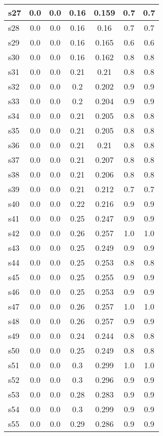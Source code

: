 \documentclass{article}
\begin{document}
\begin{tabular}{|l|c|c|c|c|c|c|}
s27 &0.0 & 0.0 & 0.16 & 0.159 & 0.7 & 0.7\\
\hline
s28 &0.0 & 0.0 & 0.16 & 0.16 & 0.7 & 0.7\\
\hline
s29 &0.0 & 0.0 & 0.16 & 0.165 & 0.6 & 0.6\\
\hline
s30 &0.0 & 0.0 & 0.16 & 0.162 & 0.8 & 0.8\\
\hline
s31 &0.0 & 0.0 & 0.21 & 0.21 & 0.8 & 0.8\\
\hline
s32 &0.0 & 0.0 & 0.2 & 0.202 & 0.9 & 0.9\\
\hline
s33 &0.0 & 0.0 & 0.2 & 0.204 & 0.9 & 0.9\\
\hline
s34 &0.0 & 0.0 & 0.21 & 0.205 & 0.8 & 0.8\\
\hline
s35 &0.0 & 0.0 & 0.21 & 0.205 & 0.8 & 0.8\\
\hline
s36 &0.0 & 0.0 & 0.21 & 0.21 & 0.8 & 0.8\\
\hline
s37 &0.0 & 0.0 & 0.21 & 0.207 & 0.8 & 0.8\\
\hline
s38 &0.0 & 0.0 & 0.21 & 0.206 & 0.8 & 0.8\\
\hline
s39 &0.0 & 0.0 & 0.21 & 0.212 & 0.7 & 0.7\\
\hline
s40 &0.0 & 0.0 & 0.22 & 0.216 & 0.9 & 0.9\\
\hline
s41 &0.0 & 0.0 & 0.25 & 0.247 & 0.9 & 0.9\\
\hline
s42 &0.0 & 0.0 & 0.26 & 0.257 & 1.0 & 1.0\\
\hline
s43 &0.0 & 0.0 & 0.25 & 0.249 & 0.9 & 0.9\\
\hline
s44 &0.0 & 0.0 & 0.25 & 0.253 & 0.8 & 0.8\\
\hline
s45 &0.0 & 0.0 & 0.25 & 0.255 & 0.9 & 0.9\\
\hline
s46 &0.0 & 0.0 & 0.25 & 0.253 & 0.9 & 0.9\\
\hline
s47 &0.0 & 0.0 & 0.26 & 0.257 & 1.0 & 1.0\\
\hline
s48 &0.0 & 0.0 & 0.26 & 0.257 & 0.9 & 0.9\\
\hline
s49 &0.0 & 0.0 & 0.24 & 0.244 & 0.8 & 0.8\\
\hline
s50 &0.0 & 0.0 & 0.25 & 0.249 & 0.8 & 0.8\\
\hline
s51 &0.0 & 0.0 & 0.3 & 0.299 & 1.0 & 1.0\\
\hline
s52 &0.0 & 0.0 & 0.3 & 0.296 & 0.9 & 0.9\\
\hline
s53 &0.0 & 0.0 & 0.28 & 0.283 & 0.9 & 0.9\\
\hline
s54 &0.0 & 0.0 & 0.3 & 0.299 & 0.9 & 0.9\\
\hline
s55 &0.0 & 0.0 & 0.29 & 0.286 & 0.9 & 0.9\\

\end{tabular}
\end{document}
